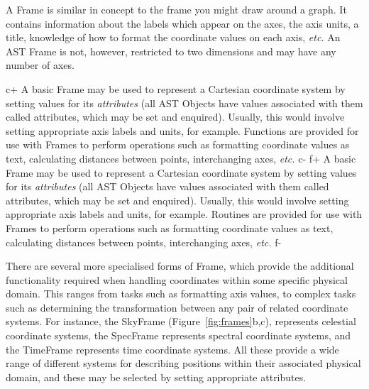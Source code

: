 \documentclass[twoside,11pt]{starlink}
\begin{document}
A Frame is similar in concept to the frame you might draw around a
graph.  It contains information about the labels which appear on the
axes, the axis units, a title, knowledge of how to format the
coordinate values on each axis, \emph{etc.}  An AST Frame is not,
however, restricted to two dimensions and may have any number of axes.

c+
A basic Frame may be used to represent a Cartesian coordinate system
by setting values for its \emph{attributes} (all AST Objects have
values associated with them called attributes, which may be set and
enquired).  Usually, this would involve setting appropriate axis
labels and units, for example.  Functions are provided for use with
Frames to perform operations such as formatting coordinate values as
text, calculating distances between points, interchanging axes,
\emph{etc.}
c-
f+
A basic Frame may be used to represent a Cartesian coordinate system
by setting values for its \emph{attributes} (all AST Objects have
values associated with them called attributes, which may be set and
enquired).  Usually, this would involve setting appropriate axis
labels and units, for example.  Routines are provided for use with
Frames to perform operations such as formatting coordinate values as
text, calculating distances between points, interchanging axes,
\emph{etc.}
f-

There are several more specialised forms of Frame, which provide the
additional functionality required when handling coordinates within some
specific physical domain. This ranges from tasks such as formatting axis
values, to complex tasks such as determining the transformation between
any pair of related coordinate systems. For instance, the SkyFrame
(Figure~\ref{fig:frames}b,c), represents celestial coordinate systems,
the SpecFrame represents spectral coordinate systems, and the TimeFrame
represents time coordinate systems. All these provide a wide range of
different systems for describing positions within their associated physical
domain, and these may be selected by setting appropriate attributes.
\end{document}
